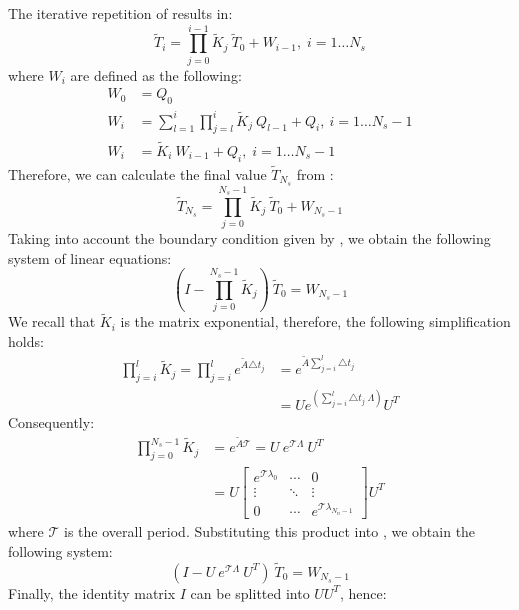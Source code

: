 The iterative repetition of  results in:
\begin{equation} \label{eq:y-recurrent}
  \tilde{T}_i = \prod_{j = 0}^{i - 1} \tilde{K}_j \: \tilde{T}_0 + W_{i - 1}, \; i = 1 \dots N_s
\end{equation}
where $W_i$ are defined as the following:
\begin{align}
  W_0 & = Q_0 \nonumber \\
  W_i & = \sum_{l = 1}^i \prod_{j = l}^i \tilde{K}_j \: Q_{l - 1} + Q_i, \: i = 1 \dots N_s - 1 \nonumber \\
  W_i & = \tilde{K}_i \: W_{i - 1} + Q_i, \; i = 1 \dots N_s - 1 \label{eq:p-recurrent}
\end{align}
Therefore, we can calculate the final value $\tilde{T}_{N_s}$ from :
\[
  \tilde{T}_{N_s} = \prod_{j = 0}^{N_s - 1} \tilde{K}_j \: \tilde{T}_0 + W_{N_s - 1}
\]
Taking into account the boundary condition given by , we obtain the following system of linear equations:
\begin{equation} \label{eq:core-system}
  (I - \prod_{j = 0}^{N_s - 1} \tilde{K}_j) \: \tilde{T}_0 = W_{N_s - 1}
\end{equation}
We recall that $\tilde{K}_i$ is the matrix exponential, therefore, the following simplification holds:
\begin{align*}
  \prod_{j = i}^l \tilde{K}_j = \prod_{j = i}^l e^{\tilde{A} \triangle t_j} & = e^{\tilde{A} \sum_{j = i}^l \triangle t_j} \\
  & = U e^{\left( \sum_{j = i}^l \triangle t_j \: \Lambda \right)} U^T
\end{align*}
Consequently:
\begin{align*}
  \prod_{j = 0}^{N_s - 1} \tilde{K}_j & = e^{\tilde{A} \mathcal{T}} = U \: e^{\mathcal{T} \Lambda} \: U^T \\
    & = U \left[
      \begin{array}{ccc}
        e^{\mathcal{T} \lambda_0} & \cdots & 0 \\
        \vdots & \ddots & \vdots \\
        0 & \cdots & e^{\mathcal{T} \lambda_{N_n - 1}}
      \end{array}
    \right] U^T
\end{align*}
where $\mathcal{T}$ is the overall period. Substituting this product into , we obtain the following system:
\[
  (I - U \: e^{\mathcal{T} \Lambda} \: U^T) \: \tilde{T}_0 = W_{N_s - 1}
\]
Finally, the identity matrix $I$ can be splitted into $U U^T$, hence:
